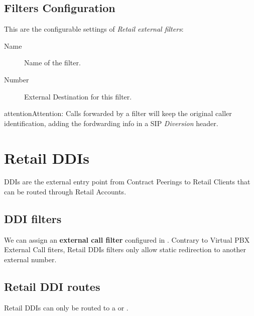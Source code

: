 \documentclass[letterpaper,10pt,english]{sphinxmanual}
\begin{document}
\subsection{Filters Configuration}
\label{retail/retail_filters:filters-configuration}
This are the configurable settings of \emph{Retail external filters}:
\begin{description}
\item[{Name}] \leavevmode{}\label{retail/retail_filters:term-name}
Name of the filter.

\item[{Number}] \leavevmode{}\label{retail/retail_filters:term-number}
External Destination for this filter.

\end{description}

\begin{notice}{attention}{Attention:}
Calls forwarded by a filter will keep the original
caller identification, adding the fordwarding info in a SIP
\emph{Diversion} header.
\end{notice}


\section{Retail DDIs}
\label{retail/retail_ddis::doc}\label{retail/retail_ddis:retail-ddis}\label{retail/retail_ddis:id1}
DDIs are the external entry point from Contract Peerings to Retail Clients that
can be routed through Retail Accounts.


\subsection{DDI filters}
\label{retail/retail_ddis:ddi-filters}
We can assign an \textbf{external call filter} configured in {\hyperref[retail/retail_filters:retail\string-filters]{}}. Contrary to Virtual PBX External Call fiters, Retail DDIs
filters only allow static redirection to another external number.


\subsection{Retail DDI routes}
\label{retail/retail_ddis:retail-ddi-routes}
Retail DDIs can only be routed to a {\hyperref[retail/retail_accounts:retail\string-accounts]{}}
or {\hyperref[faxing/index:faxing\string-system]{}}.
\end{document}
